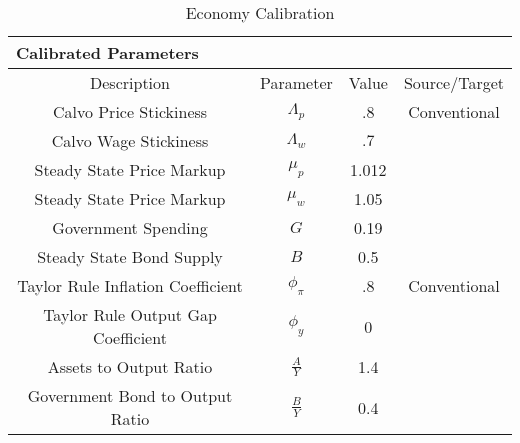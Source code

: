 \begin{table}
\begin{center}\renewcommand{\arraystretch}{1.5}
\caption{Economy Calibration}\label{table:Calibration}
\begin{tabular}{|c|ccl|c|}
\hline
\multicolumn{5}{|l|}{Calibrated Parameters}  \\ \hline
Description                     & \multicolumn{1}{c}{Parameter} & Value & \multicolumn{2}{c|}{Source/Target }\\ \hline
Calvo Price Stickiness & \multicolumn{1}{c}{$\Lambda_{p}$} & .8 & \multicolumn{2}{c|}{Conventional} \\
Calvo Wage Stickiness                & \multicolumn{1}{c}{$\Lambda_{w}$} & $.7$ & \multicolumn{2}{c|}{} \\
Steady State Price Markup          & \multicolumn{1}{c}{$\mu_{p}$} & 1.012 & \multicolumn{2}{c|}{} \\
Steady State Price Markup          & \multicolumn{1}{c}{$\mu_{w}$} & 1.05 & \multicolumn{2}{c|}{} \\
 Government Spending       & \multicolumn{1}{c}{$G$} & 0.19 & \multicolumn{2}{c|}{} \\
 Steady State Bond Supply       & \multicolumn{1}{c}{$B$} & 0.5 & \multicolumn{2}{c|}{} \\
Taylor Rule Inflation Coefficient        & \multicolumn{1}{c}{$\phi_{\pi}$} & .8 & \multicolumn{2}{c|}{Conventional} \\
 Taylor Rule Output Gap Coefficient       & \multicolumn{1}{c}{$\phi_{y}$} & 0 & \multicolumn{2}{c|}{} \\
Assets to Output Ratio       & \multicolumn{1}{c}{$\frac{A}{Y}$} & 1.4 & \multicolumn{2}{c|}{} \\
Government Bond to Output Ratio & \multicolumn{1}{c}{$\frac{B}{Y}$} & 0.4 & \multicolumn{2}{c|}{} \\ \hline
\end{tabular}
\end{center}
\end{table}